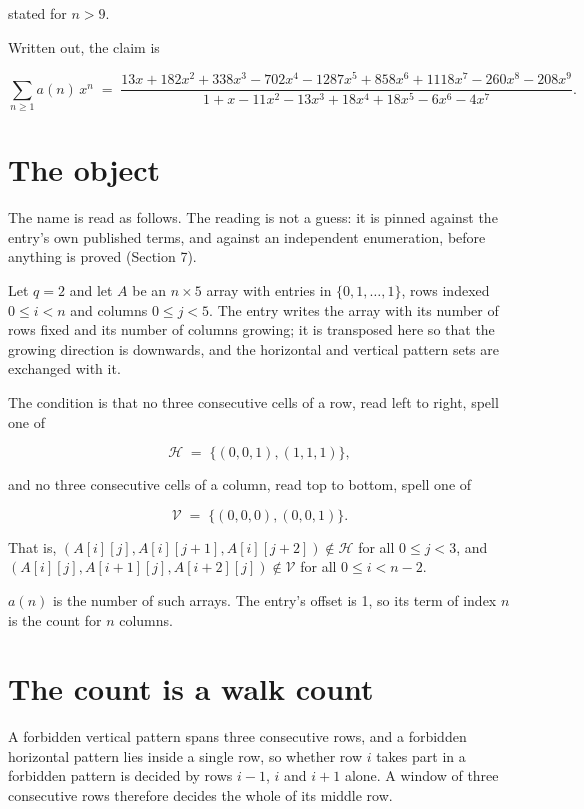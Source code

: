 \documentclass[11pt]{article}
\theoremstyle{definition}
\begin{document}
stated for $n > 9$.

Written out, the claim is

\[\sum_{n \ge 1} a(n)\,x^n \;=\; \frac{13x + 182x^{2} + 338x^{3} - 702x^{4} - 1287x^{5} + 858x^{6} + 1118x^{7} - 260x^{8} - 208x^{9}}{1 + x - 11x^{2} - 13x^{3} + 18x^{4} + 18x^{5} - 6x^{6} - 4x^{7}}.\]

\section{The object}

The name is read as follows. The reading is not a guess: it is pinned against the entry's own published terms, and against an independent enumeration, before anything is proved (Section 7).

Let $q = 2$ and let $A$ be an $n \times 5$ array with entries in $\{0,1,\dots,1\}$, rows indexed $0 \le i < n$ and columns $0 \le j < 5$. The entry writes the array with its number of rows fixed and its number of columns growing; it is transposed here so that the growing direction is downwards, and the horizontal and vertical pattern sets are exchanged with it.

The condition is that no three consecutive cells of a row, read left to right, spell one of

\[\mathcal{H} \;=\; \{(0,0,1), (1,1,1)\},\]

and no three consecutive cells of a column, read top to bottom, spell one of

\[\mathcal{V} \;=\; \{(0,0,0), (0,0,1)\}.\]

That is, $(A[i][j],A[i][j{+}1],A[i][j{+}2]) \notin \mathcal{H}$ for all $0 \le j < 3$, and $(A[i][j],A[i{+}1][j],A[i{+}2][j]) \notin \mathcal{V}$ for all $0 \le i < n-2$.

$a(n)$ is the number of such arrays. The entry's offset is 1, so its term of index $n$ is the count for $n$ columns.

\section{The count is a walk count}

A forbidden vertical pattern spans three consecutive rows, and a forbidden horizontal pattern lies inside a single row, so whether row $i$ takes part in a forbidden pattern is decided by rows $i-1$, $i$ and $i+1$ alone. A window of three consecutive rows therefore decides the whole of its middle row.
\end{document}

